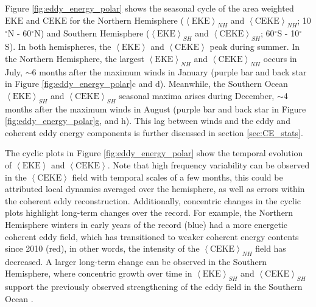 \documentclass[draft,linenumbers]{agujournal2019}
\newcommand{\EKE}{\textrm{EKE}}
\newcommand{\CEKE}{\textrm{CEKE}}
\begin{document}
	Figure \ref{fig:eddy_energy_polar} shows the seasonal cycle of the area weighted $\EKE$ and $\CEKE$ for the Northern Hemisphere ($\left< \EKE\right>_{NH}$ and $\left< \CEKE\right>_{NH}$; 10$^\circ$N - 60$^\circ$N) and Southern Hemisphere ($\left< \EKE\right>_{SH}$  and $\left< \CEKE\right>_{SH}$; 60$^\circ$S - 10$^\circ$S). 
	In both hemispheres, the $\left<\EKE\right>$ and $\left<\CEKE\right>$ peak during summer. In the Northern Hemisphere, the largest $\left<\EKE\right>_{NH}$ and $\left<\CEKE\right>_{NH}$ occurs in July, $\sim$6 months after the maximum winds in January (purple bar and back star in Figure \ref{fig:eddy_energy_polar}c and d). Meanwhile, the Southern Ocean 
	$\left<\EKE\right>_{SH}$ and $\left<\CEKE\right>_{SH}$ seasonal maxima arises during December, $\sim$4 months after the maximum winds in August (purple bar and back star in Figure \ref{fig:eddy_energy_polar}g, and h). This lag between winds and the eddy and coherent eddy energy components is further discussed in section \ref{sec:CE_stats}.

	The cyclic plots in Figure \ref{fig:eddy_energy_polar} show the temporal evolution of $\left<\EKE\right>$ and $\left<\CEKE\right>$. 
	Note that high frequency variability can be observed in the $\left<\CEKE\right>$ field with temporal scales of a few months, this could be attributed local dynamics averaged over the hemisphere, as well as errors within the coherent eddy reconstruction. 
	Additionally, concentric changes in the cyclic plots highlight long-term changes over the record. For example, the Northern Hemisphere winters in early years of the record (blue) had a more energetic coherent eddy field, which has transitioned to weaker coherent energy contents since 2010 (red), in other words, the intensity of the $\left<\CEKE\right>_{NH}$ field has decreased. A larger long-term change can be observed in the Southern Hemisphere, where concentric growth over time in $\left<\EKE\right>_{SH}$ and $\left<\CEKE\right>_{SH}$ support the previously observed strengthening of the eddy field in the Southern Ocean \citep{Hogg_Recent_2015,Martinez_TKE_2019,Martinez_Kinetic_2021}. 
\end{document}
